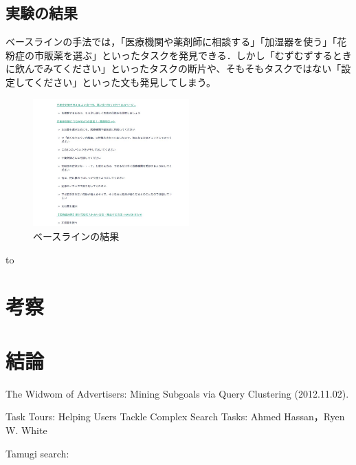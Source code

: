 \documentclass[submit,techreq]{ipsj}
\begin{document}
\subsection{実験の結果}

ベースラインの手法では，「医療機関や薬剤師に相談する」「加湿器を使う」「花粉症の市販薬を選ぶ」といったタスクを発見できる．しかし「むずむずするときに飲んでみてください」といったタスクの断片や、そもそもタスクではない「設定してください」といった文も発見してしまう。

\begin{figure}[tb]
\includegraphics[width=6cm, bb=0 0 550 719]{base_line3.jpg}
\caption{ベースラインの結果}
\label{fig:single}
\end{figure}



\begin{table}[tb] 
\caption{花粉症対策の方法タスク検索} 
\label{tab:example}
\hbox to
\end{table}



\section{考察}


\section{結論}




\begin{thebibliography}{10}


The Widwom of Advertisers: Mining Subgoals via Query Clustering
(2012.11.02).

Task Tours: Helping Users Tackle Complex Search Tasks:
Ahmed Hassan，Ryen W. White

Tamugi search:




\end{thebibliography}



\begin{biography}
%
\end{biography}
\end{document}
